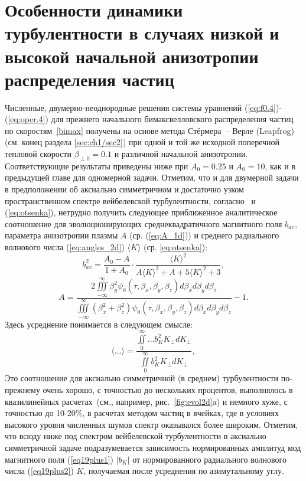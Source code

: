 \section{Особенности динамики турбулентности в случаях низкой и высокой начальной анизотропии распределения частиц}
\label{sec:ch2/sec2}

Численные, двумерно-неоднородные решения системы уравнений (\ref{eq:f0.4})-(\ref{eq:oper.4}) для прежнего начального бимаксвелловского распределения частиц по скоростям~\ref{bimax} получены на основе метода Стёрмера~-- Верле (Leapfrog)~\cite{Birdsall2018} (см. конец раздела \ref{sec:ch1/sec2}) при одной и той же исходной поперечной тепловой скорости $\beta_{\perp0}=0.1$ и различной начальной анизотропии. 
Соответствующие результаты приведены ниже при $A_0=0.25$ и $A_0=10$, как и в предыдущей главе для одномерной задачи. 
Отметим, что и для двумерной задачи в предположении об аксиально симметричном и достаточно узком пространственном спектре вейбелевской турбулентности, согласно~\cite{Nechaev2023} и (\ref{eq:otsenka}), нетрудно получить следующее приближенное аналитическое соотношение для эволюционирующих среднеквадратичного магнитного поля $b_{av}$, параметра анизотропии плазмы $A$ (ср. (\ref{eq:A_1d})) и среднего радиального волнового числа (\ref{eq:angles_2d}) $\langle K\rangle$ (ср. \ref{eq:otsenka}): 
\begin{equation}
\label{eq:otsenka2d}
b_{av}^2 = \frac{A_0-A}{1+A_0}\cdot\dfrac{\langle K\rangle^2}{A \langle K\rangle^2+A+5\langle K\rangle^2+3} ,
\end{equation}
\begin{equation}
\label{eq:A_2d}
A=\frac{2\iiint\limits^{\infty}_{-\infty}\beta_y^2\psi_{0}(\tau,\beta_x,\beta_y,\beta_z) d\beta_x d\beta_yd\beta_z}{\iiint\limits^{\infty}_{-\infty}\left(\beta_x^2+\beta_z^2\right)\psi_{0}(\tau,\beta_x,\beta_y,\beta_z) d\beta_x d\beta_y d\beta_z}-1 .
\end{equation}
Здесь усреднение понимается в следующем смысле:
\begin{equation}
\label{eq:angles_2d}
\langle...\rangle=\frac{\iint\limits_0^\infty...b_K^2 K_\perp dK_\perp}{\iint\limits_0^\infty b_K^2 K_\perp dK_\perp}, 
\end{equation}
Это соотношение для аксиально симметричной (в среднем) турбулентности по-прежнему очень хорошо, с точностью до нескольких процентов, выполнялось в квазилинейных расчетах~(см., например, рис.~\ref{fig:evol2d}a) и немного хуже, с точностью до 10-20\%, в расчетах методом частиц в ячейках, где в условиях высокого уровня численных шумов спектр оказывался более широким. Отметим, что всюду ниже под спектром вейбелевской турбулентности в аксиально симметричной задаче подразумевается зависимость нормированных амплитуд мод магнитного поля (\ref{eq19plus1}) $|b_K|$ от нормированного радиального волнового числа (\ref{eq19plus2}) $K$, получаемая после усреднения по азимутальному углу. 
